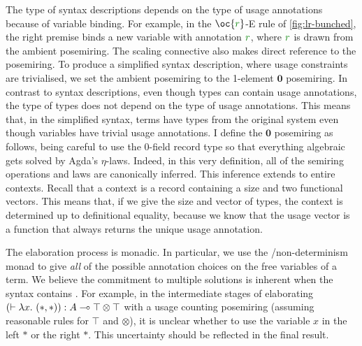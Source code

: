 The type of syntax descriptions depends on the type of usage annotations because
of variable binding.
For example, in the $\oc{\gr r}$-E rule of \cref{fig:lr-bunched}, the right
premise binds a new variable with annotation $\gr r$, where $\gr r$ is drawn
from the ambient posemiring.
The scaling connective also makes direct reference to the posemiring.
To produce a simplified syntax description, where usage constraints are
trivialised, we set the ambient posemiring to the 1-element $\mathbf0$
posemiring.
In contrast to syntax descriptions, even though types can contain usage
annotations, the type of types does not depend on the type of usage annotations.
This means that, in the simplified syntax, terms have types from the original
system even though variables have trivial usage annotations.
I define the $\mathbf0$ posemiring as follows, being careful to use the
0-field record type \AgdaRecord{$\top$} so that everything algebraic gets
solved by Agda's $\eta$-laws.
Indeed, in this very definition, all of the semiring operations and laws are
canonically inferred.
This inference extends to entire contexts.
Recall that a context is a record containing a size and two functional vectors.
This means that, if we give the size and vector of types, the context is
determined up to definitional equality, because we know that the usage vector
is a function that always returns the unique usage annotation.


The elaboration process is monadic.
In particular, we use the /non-determinism monad to give
\emph{all} of the possible annotation choices on the free variables of a term.
We believe the commitment to multiple solutions is inherent when the syntax
contains .
For example, in the intermediate stages of elaborating
$\plr{\vdash \lambda x.~\plr{*,*}} : A \multimap \top \otimes \top$ with a
usage counting posemiring (assuming reasonable rules for $\top$ and $\otimes$),
it is unclear whether to use the variable $x$ in the left $*$ or the right $*$.
This uncertainty should be reflected in the final result.

